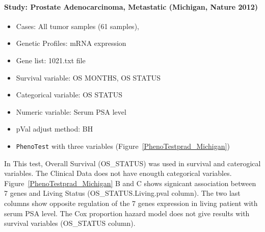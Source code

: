 \documentclass[a4paper]{article}
\begin{document}
\paragraph{Study: Prostate Adenocarcinoma, Metastatic (Michigan, Nature 2012)} 
\begin{itemize}
    \item Cases: All tumor samples (61 samples),
    \item Genetic Profiles: mRNA expression 
    \item Gene list: 1021.txt file
    \item Survival variable: OS MONTHS, OS STATUS
    \item Categorical variable: OS STATUS
    \item Numeric variable: Serum PSA level
    \item pVal adjust method: BH
    \item \texttt{PhenoTest} with three variables (Figure~\ref{PhenoTestprad_Michigan})
\end{itemize}

In This test, Overall Survival (OS\_STATUS) was used in survival and caterogical variables. The Clinical Data does not have enougth categorical variables. Figure~\ref{PhenoTestprad_Michigan} B and C shows signicant association between 7 genes and Living Status (OS\_STATUS.Living.pval column). The two last columns show opposite regulation of the 7 genes expression in living patient with serum PSA level. The Cox proportion hazard model does not give results with survival variables (OS\_STATUS column).   
\end{document}
